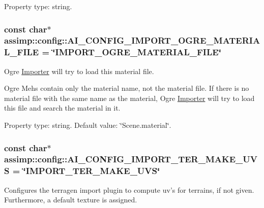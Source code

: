 Property type\+: string. \hypertarget{namespaceassimp_1_1config_aa6d8f2b5cf8b40f75a81004604fe1041}{
\subsubsection[{A\+I\+\_\+\+C\+O\+N\+F\+I\+G\+\_\+\+I\+M\+P\+O\+R\+T\+\_\+\+O\+G\+R\+E\+\_\+\+M\+A\+T\+E\+R\+I\+A\+L\+\_\+\+F\+I\+L\+E}]{\setlength{\rightskip}{0pt plus 5cm}const char$\ast$ assimp\+::config\+::\+A\+I\+\_\+\+C\+O\+N\+F\+I\+G\+\_\+\+I\+M\+P\+O\+R\+T\+\_\+\+O\+G\+R\+E\+\_\+\+M\+A\+T\+E\+R\+I\+A\+L\+\_\+\+F\+I\+L\+E = \char`\"{}I\+M\+P\+O\+R\+T\+\_\+\+O\+G\+R\+E\+\_\+\+M\+A\+T\+E\+R\+I\+A\+L\+\_\+\+F\+I\+L\+E\char`\"{}}}\label{namespaceassimp_1_1config_aa6d8f2b5cf8b40f75a81004604fe1041}
Ogre \hyperlink{class_importer}{Importer} will try to load this material file.

Ogre Mehs contain only the material name, not the material file. If there is no material file with the same name as the material, Ogre \hyperlink{class_importer}{Importer} will try to load this file and search the material in it.

Property type\+: string. Default value\+: \char`\"{}\+Scene.\+material\char`\"{}. \hypertarget{namespaceassimp_1_1config_abd588cf6059277ffed401109a704f132}{
\subsubsection[{A\+I\+\_\+\+C\+O\+N\+F\+I\+G\+\_\+\+I\+M\+P\+O\+R\+T\+\_\+\+T\+E\+R\+\_\+\+M\+A\+K\+E\+\_\+\+U\+V\+S}]{\setlength{\rightskip}{0pt plus 5cm}const char$\ast$ assimp\+::config\+::\+A\+I\+\_\+\+C\+O\+N\+F\+I\+G\+\_\+\+I\+M\+P\+O\+R\+T\+\_\+\+T\+E\+R\+\_\+\+M\+A\+K\+E\+\_\+\+U\+V\+S = \char`\"{}I\+M\+P\+O\+R\+T\+\_\+\+T\+E\+R\+\_\+\+M\+A\+K\+E\+\_\+\+U\+V\+S\char`\"{}}}\label{namespaceassimp_1_1config_abd588cf6059277ffed401109a704f132}
Configures the terragen import plugin to compute uv's for terrains, if not given. Furthermore, a default texture is assigned.

